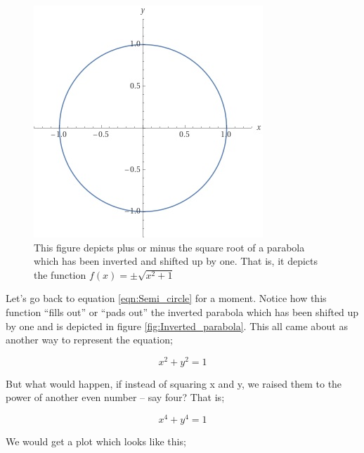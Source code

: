 \documentclass{article}
\begin{document}
\begin{figure}
  \includegraphics[scale=1.0]{images/Unit_circle.jpg}
  \caption{This figure depicts plus or minus the square root of a parabola which has been inverted and shifted
  up by one. That is, it depicts the function $f(x) = \pm\sqrt{x^{2} + 1}$}
  \label{fig:Unit_circle}
\end{figure}

Let's go back to equation \ref{eqn:Semi_circle} for a moment. Notice how this function ``fills out'' or ``pads out''
the inverted parabola which has been shifted up by one and is depicted in figure \ref{fig:Inverted_parabola}. This
all came about as another way to represent the equation;

\begin{equation*}
x^2 + y^2 = 1
\end{equation*}

But what would happen, if instead of squaring x and y, we raised them to the power of another even number -- say
four? That is;

\begin{equation*}
x^4 + y^4 = 1
\end{equation*}

We would get a plot which looks like this;
\end{document}
